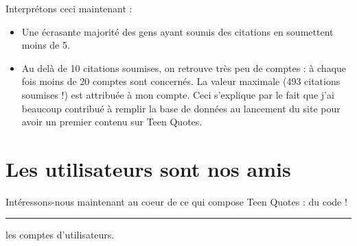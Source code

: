 \documentclass{report}
\newlength{\textlarg}
\newcommand{\barre}[1]{%
   \settowidth{\textlarg}{#1}
   #1\hspace{-\textlarg}\rule[0.5ex]{\textlarg}{0.5pt}}
\begin{document}
	Interprétons ceci maintenant :
	\vspace{10px}
	\begin{itemize}
		\item Une écrasante majorité des gens ayant soumis des citations en soumettent moins de 5.
		\item Au delà de 10 citations soumises, on retrouve très peu de comptes : à chaque fois moins de 20 comptes sont concernés. La valeur maximale (493 citations soumises !) est attribuée à mon compte. Ceci s'explique par le fait que j'ai beaucoup contribué à remplir la base de données au lancement du site pour avoir un premier contenu sur Teen Quotes. 
	\end{itemize}
	\vspace{10px}

	\chapter{Les utilisateurs sont nos amis}
	Intéressons-nous maintenant au coeur de ce qui compose Teen Quotes : \barre{du code !} les comptes \mbox{d'utilisateurs}. 

\end{document}
